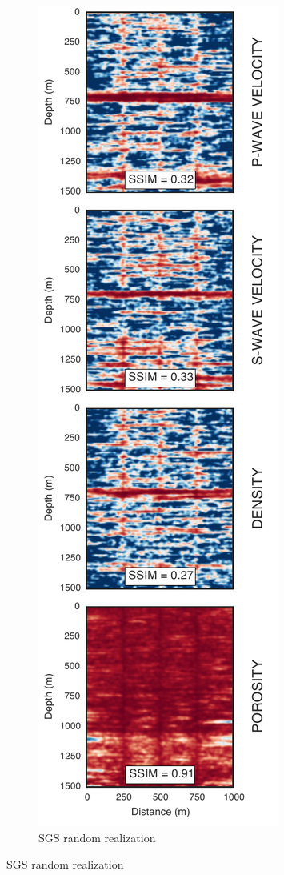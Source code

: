 \begin{figure}[!ht]
        \centering
        \begin{subfigure}[b]{.35\textwidth}
                \caption{SGS random realization}
                \includegraphics[width=\textwidth]{fig/ssim_a.pdf}

\end{subfigure}
\end{figure}
